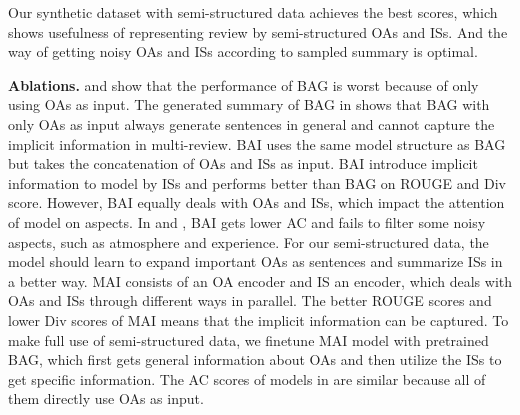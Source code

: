 Our synthetic dataset with semi-structured data 
achieves the best scores, which shows  
usefulness of representing review by semi-structured OAs and ISs. 
And the way of getting noisy OAs and ISs according to sampled summary 
is optimal.

\textbf{Ablations.}
 and  show that the performance of
BAG is worst because
of only using OAs as input.
The generated summary of BAG in  
shows that BAG with only OAs as input always generate 
sentences in general and cannot capture
the implicit information in multi-review.
BAI uses the same model structure as BAG
but takes the concatenation of OAs and ISs as input.
BAI introduce implicit information 
to model by ISs and performs better than BAG on ROUGE and Div score.
However, BAI equally deals with OAs and ISs,
which impact the attention of model on aspects.
In  and ,
BAI gets lower AC and fails to filter some noisy aspects, such as atmosphere and experience.
For our semi-structured data,
the model should learn to expand important OAs as sentences and summarize ISs in a better way.
MAI consists of an OA encoder and IS an encoder,
which deals with OAs and ISs through different ways in parallel.
The better ROUGE scores and lower Div scores
of MAI means that the implicit information can be captured.
To make full use of semi-structured data,
we finetune MAI model with pretrained BAG,
which first gets general information about OAs and
then utilize the ISs to get specific information.
The AC scores of models in  are similar
because all of them directly use OAs as input.

